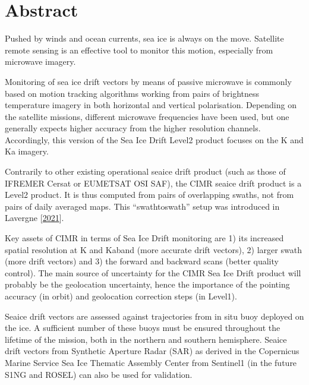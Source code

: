 \documentclass[letterpaper,10pt,english]{jupyterBook}
\begin{document}
\sphinxstepscope


\chapter{Abstract}
\label{\detokenize{abstract:abstract}}\label{\detokenize{abstract::doc}}
\sphinxAtStartPar
Pushed by winds and ocean currents, sea ice is always on the move. Satellite remote sensing is an effective tool to monitor this motion, especially from microwave imagery.

\sphinxAtStartPar
Monitoring of sea ice drift vectors by means of passive microwave is commonly based on motion tracking algorithms working from pairs of brightness temperature imagery in both horizontal and vertical polarisation.
Depending on the satellite missions, different microwave frequencies have been used, but one generally expects higher accuracy from the higher resolution channels.
Accordingly, this version of the Sea Ice Drift Level\sphinxhyphen{}2 product focuses on the K and Ka imagery.

\sphinxAtStartPar
Contrarily to other existing operational sea\sphinxhyphen{}ice drift product (such as those of IFREMER Cersat or EUMETSAT OSI SAF), the CIMR sea\sphinxhyphen{}ice drift product is a Level\sphinxhyphen{}2 product. It is thus computed from pairs of
overlapping swaths, not from pairs of daily averaged maps. This “swath\sphinxhyphen{}to\sphinxhyphen{}swath” setup was introduced in Lavergne  {[}\hyperlink{cite.references:id20}{2021}{]}.

\sphinxAtStartPar
Key assets of CIMR in terms of Sea Ice Drift monitoring are 1) its increased spatial resolution at K\sphinxhyphen{} and Ka\sphinxhyphen{}band (more accurate drift vectors), 2) larger swath (more drift vectors) and 3) the forward
and backward scans (better quality control). The main source of uncertainty for the CIMR Sea Ice Drift product will probably be the geolocation uncertainty, hence the importance of the pointing
accuracy (in orbit) and geolocation correction steps (in Level\sphinxhyphen{}1).

\sphinxAtStartPar
Sea\sphinxhyphen{}ice drift vectors are assessed against trajectories from in situ buoy deployed on the ice. A sufficient number of these buoys must be ensured throughout the lifetime of the mission, both in the northern and
southern hemisphere. Sea\sphinxhyphen{}ice drift vectors from Synthetic Aperture Radar (SAR) as derived in the Copernicus Marine Service Sea Ice Thematic Assembly Center from Sentinel\sphinxhyphen{}1 (in the future S1\sphinxhyphen{}NG and ROSE\sphinxhyphen{}L) can also
be used for validation.
\end{document}
